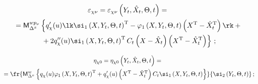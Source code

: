 \vspace*{-12pt}

    

    \noindent

    \begin{multline*}

    \varepsilon_{\chi \nu}= \varepsilon_{\chi \nu} \left(Y_t,\hat X_t,\Theta,t\right)

    ={}\\

    {}={\sf M}_{\Delta^x}^{w p_\nu} \left\{

                 q_\chi '(u) \lk \si_1 \left(X,Y_t,\Theta,t\right)^{\mathrm{T}}

    -\varphi_1 \left(X,Y_t,\Theta,t\right)\left(X^{\mathrm{T}}-\hat X_t^{\mathrm{T}}\right)

    \rk+{}\right.\\

\left.{}+ 2q_\chi'' (u)\si_1

    \left(X,Y_t,\Theta,t\right)^{\mathrm{T}} C_t\left(X-\hat X_t\right)

    \left(X^{\mathrm{T}}-\hat X_t^{\mathrm{T}}\right)\right\}\,;


    \end{multline*}

    

    \vspace*{-12pt}

    

    \noindent

    \begin{multline*}

    \eta_{\chi 0} = \eta_{\chi 0} \left(Y_t,\hat X_t,\Theta,t\right)

    ={}\\

    {}=\fr{{\sf M}_{\Delta^x}^{w}\left\{ 

    q_\chi (u) \varphi_1 \left(X,Y_t,\Theta,t\right)^{\mathrm{T}} +

    q_\chi' (u)\left(X^{\mathrm{T}}-\hat X_t^{\mathrm{T}}\right) 

    C_t \si_1 \left(X,Y_t,\Theta,t\right)

\right\}}{\si_2 \left(Y_t,\Theta,t\right)}\,;


\end{multline*}



